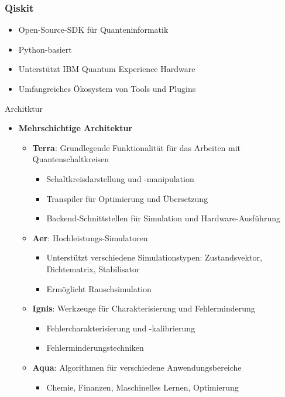 \subsubsection{Qiskit}
\begin{itemize}
            \item Open-Source-SDK für Quanteninformatik
            \item Python-basiert
            \item Unterstützt IBM Quantum Experience Hardware
            \item Umfangreiches Ökosystem von Tools und Plugins
            
        \end{itemize}
Architktur
\begin{itemize}
    \item \textbf{Mehrschichtige Architektur}
    \begin{itemize}
        \item \textbf{Terra}: Grundlegende Funktionalität für das Arbeiten mit Quantenschaltkreisen
        \begin{itemize}
            \item Schaltkreisdarstellung und -manipulation
            \item Transpiler für Optimierung und Übersetzung
            \item Backend-Schnittstellen für Simulation und Hardware-Ausführung
        \end{itemize}
        
        \item \textbf{Aer}: Hochleistungs-Simulatoren
        \begin{itemize}
            \item Unterstützt verschiedene Simulationstypen: Zustandsvektor, Dichtematrix, Stabilisator
            \item Ermöglicht Rauschsimulation
        \end{itemize}
        
        \item \textbf{Ignis}: Werkzeuge für Charakterisierung und Fehlerminderung
        \begin{itemize}
            \item Fehlercharakterisierung und -kalibrierung
            \item Fehlerminderungstechniken
        \end{itemize}
        
        \item \textbf{Aqua}: Algorithmen für verschiedene Anwendungsbereiche
        \begin{itemize}
            \item Chemie, Finanzen, Maschinelles Lernen, Optimierung
        \end{itemize}
    \end{itemize}
    

\end{itemize}
